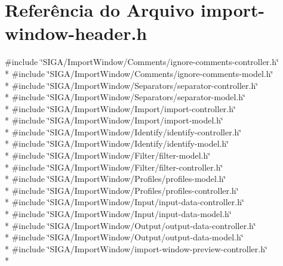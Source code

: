 \section{Referência do Arquivo import-\/window-\/header.h}
\label{import-window-header_8h}
{\ttfamily \#include \char`\"{}S\+I\+G\+A/\+Import\+Window/\+Comments/ignore-\/comments-\/controller.\+h\char`\"{}}\\*
{\ttfamily \#include \char`\"{}S\+I\+G\+A/\+Import\+Window/\+Comments/ignore-\/comments-\/model.\+h\char`\"{}}\\*
{\ttfamily \#include \char`\"{}S\+I\+G\+A/\+Import\+Window/\+Separators/separator-\/controller.\+h\char`\"{}}\\*
{\ttfamily \#include \char`\"{}S\+I\+G\+A/\+Import\+Window/\+Separators/separator-\/model.\+h\char`\"{}}\\*
{\ttfamily \#include \char`\"{}S\+I\+G\+A/\+Import\+Window/\+Import/import-\/controller.\+h\char`\"{}}\\*
{\ttfamily \#include \char`\"{}S\+I\+G\+A/\+Import\+Window/\+Import/import-\/model.\+h\char`\"{}}\\*
{\ttfamily \#include \char`\"{}S\+I\+G\+A/\+Import\+Window/\+Identify/identify-\/controller.\+h\char`\"{}}\\*
{\ttfamily \#include \char`\"{}S\+I\+G\+A/\+Import\+Window/\+Identify/identify-\/model.\+h\char`\"{}}\\*
{\ttfamily \#include \char`\"{}S\+I\+G\+A/\+Import\+Window/\+Filter/filter-\/model.\+h\char`\"{}}\\*
{\ttfamily \#include \char`\"{}S\+I\+G\+A/\+Import\+Window/\+Filter/filter-\/controller.\+h\char`\"{}}\\*
{\ttfamily \#include \char`\"{}S\+I\+G\+A/\+Import\+Window/\+Profiles/profiles-\/model.\+h\char`\"{}}\\*
{\ttfamily \#include \char`\"{}S\+I\+G\+A/\+Import\+Window/\+Profiles/profiles-\/controller.\+h\char`\"{}}\\*
{\ttfamily \#include \char`\"{}S\+I\+G\+A/\+Import\+Window/\+Input/input-\/data-\/controller.\+h\char`\"{}}\\*
{\ttfamily \#include \char`\"{}S\+I\+G\+A/\+Import\+Window/\+Input/input-\/data-\/model.\+h\char`\"{}}\\*
{\ttfamily \#include \char`\"{}S\+I\+G\+A/\+Import\+Window/\+Output/output-\/data-\/controller.\+h\char`\"{}}\\*
{\ttfamily \#include \char`\"{}S\+I\+G\+A/\+Import\+Window/\+Output/output-\/data-\/model.\+h\char`\"{}}\\*
{\ttfamily \#include \char`\"{}S\+I\+G\+A/\+Import\+Window/import-\/window-\/preview-\/controller.\+h\char`\"{}}\\*
